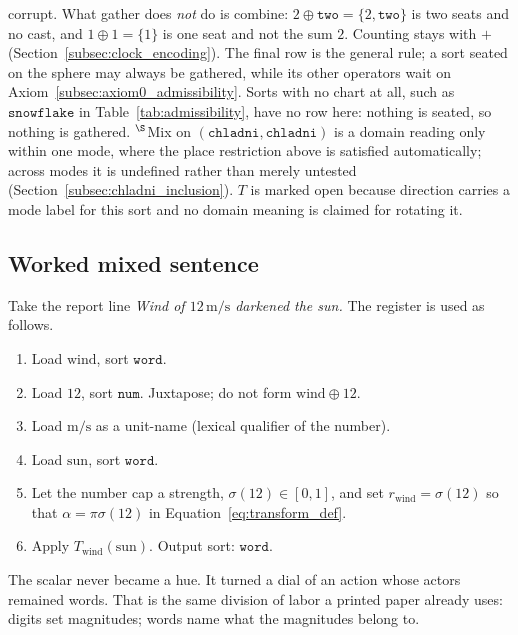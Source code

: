 \documentclass[12pt, a4paper]{article}
\begin{document}
\begin{table}[h]
{corrupt. What gather does \emph{not} do is combine: $2\oplus
\texttt{two}=\{2,\texttt{two}\}$ is two seats and no cast, and
$1\oplus 1=\{1\}$ is one seat and not the sum $2$. Counting stays with
$+$ (Section~\ref{subsec:clock_encoding}). The final row is the
general rule; a sort seated on the sphere may always be gathered, while
its other operators wait on
Axiom~\ref{subsec:axiom0_admissibility}. Sorts with no chart at all,
such as $\mathtt{snowflake}$ in Table~\ref{tab:admissibility}, have no
row here: nothing is seated, so nothing is gathered.
$^{\S}$Mix on $(\mathtt{chladni},\mathtt{chladni})$ is a domain
reading only within one mode, where the place restriction above is
satisfied automatically; across modes it is undefined rather than
merely untested (Section~\ref{subsec:chladni_inclusion}). $T$ is
marked open because direction carries a mode label for this sort and
no domain meaning is claimed for rotating it.}
\label{tab:type_table}
\end{table}

\subsection{Worked mixed sentence}
\label{subsec:mixed_sentence}
Take the report line \emph{Wind of $12\,\mathrm{m/s}$ darkened the sun.}
The register is used as follows.

\begin{enumerate}
    \item Load $\mathrm{wind}$, sort $\mathtt{word}$.
    \item Load $12$, sort $\mathtt{num}$. Juxtapose; do not form
          $\mathrm{wind}\oplus 12$.
    \item Load $\mathrm{m/s}$ as a unit-name (lexical qualifier of the
          number).
    \item Load $\mathrm{sun}$, sort $\mathtt{word}$.
    \item Let the number cap a strength,
          $\sigma(12)\in[0,1]$, and set
          $r_{\mathrm{wind}}=\sigma(12)$ so that
          $\alpha=\pi\sigma(12)$ in Equation~\eqref{eq:transform_def}.
    \item Apply $T_{\mathrm{wind}}(\mathrm{sun})$. Output sort:
          $\mathtt{word}$.
\end{enumerate}
The scalar never became a hue. It turned a dial of an action whose
actors remained words. That is the same division of labor a printed
paper already uses: digits set magnitudes; words name what the
magnitudes belong to.
\end{document}

